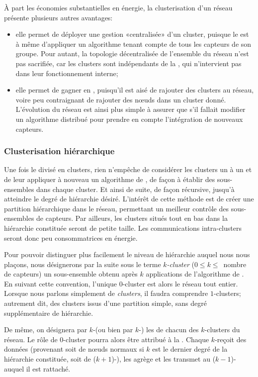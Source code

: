 À part les économies substantielles en énergie, la clusterisation d'un réseau présente plusieurs autres avantages:
\begin{itemize}
    \item elle permet de déployer une gestion «centralisée» d'un cluster, puisque le \ch est à même d'appliquer un algorithme tenant compte de tous les capteurs de son groupe. Pour autant, la topologie décentralisée de l'ensemble du réseau n'est pas sacrifiée, car les clusters sont indépendants de la \sdb, qui n'intervient pas dans leur fonctionnement interne;
    \item elle permet de gagner en , puisqu'il est aisé de rajouter des clusters au réseau, voire peu contraignant de rajouter des nœuds dans un cluster donné. L'évolution du réseau est ainsi plus simple à assurer que s'il fallait modifier un algorithme distribué pour prendre en compte l'intégration de nouveaux capteurs.
\end{itemize}

        \subsubsection{Clusterisation hiérarchique}
Une fois le \rc divisé en clusters, rien n'empêche de considérer les clusters un à un et de leur appliquer à nouveau un algorithme de , de façon à établir des sous-ensembles dans chaque cluster.
Et ainsi de suite, de façon récursive, jusqu'à atteindre le degré de hiérarchie désiré.
L'intérêt de cette méthode est de créer une partition hiérarchique dans le réseau, permettant un meilleur contrôle des sous-ensembles de capteurs.
Par ailleurs, les clusters situés tout en bas dans la hiérarchie constituée seront de petite taille.
Les communications intra-clusters seront donc peu consommatrices en énergie.

Pour pouvoir distinguer plus facilement le niveau de hiérarchie auquel nous nous plaçons, nous désignerons par la suite sous le terme \textit{$k$-cluster} ($0 \leq k \leq$~nombre de capteurs) un sous-ensemble obtenu après $k$ applications de l'algorithme de .
En suivant cette convention, l'unique $0$-cluster est alors le réseau tout entier.
Lorsque nous parlons simplement de \textit{clusters}, il faudra comprendre $1$-clusters; autrement dit, des clusters issus d'une partition simple, sans degré supplémentaire de hiérarchie.

De même, on désignera par $k$-\ch (ou bien par $k$-\CH) les \chs de chacun des $k$-clusters du réseau.
Le rôle de $0$-cluster pourra alors être attribué à la \sdb.
Chaque $k$-\CH reçoit des données (provenant soit de nœuds normaux si $k$ est le dernier degré de la hiérarchie constituée, soit de ($k+1$)-\CH), les agrège et les transmet au ($k-1$)-\CH auquel il est rattaché.

